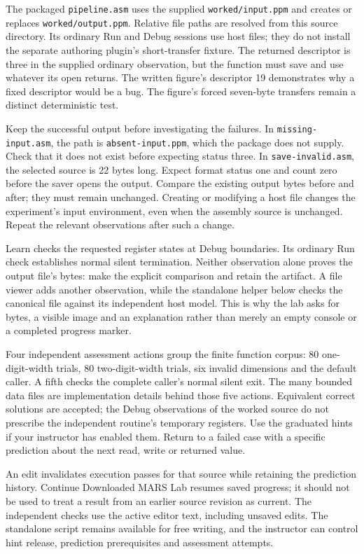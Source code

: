 The packaged \texttt{pipeline.asm} uses the supplied \texttt{worked/\allowbreak input.ppm}
and creates or replaces \texttt{worked/\allowbreak output.ppm}. Relative file paths are
resolved from this source directory. Its ordinary Run and Debug sessions use
host files; they do not install the separate authoring plugin's short-transfer
fixture. The returned descriptor is three in the supplied ordinary observation,
but the function must save and use whatever its open returns. The written
figure's descriptor 19 demonstrates why a fixed descriptor would be a bug.
The figure's forced seven-byte transfers remain a distinct deterministic test.

Keep the successful output before investigating the failures. In
\texttt{missing-input.asm}, the path is \texttt{absent-input.ppm}, which the
package does not supply. Check that it does not exist before expecting status
three. In \texttt{save-invalid.asm}, the selected source is 22 bytes long.
Expect format status one and count zero before the saver opens the output.
Compare the existing output bytes before and after; they must remain unchanged.
Creating or modifying a host file changes the experiment's input environment,
even when the assembly source is unchanged. Repeat the relevant observations
after such a change.

Learn checks the requested register states at Debug boundaries. Its ordinary
Run check establishes normal silent termination. Neither observation alone
proves the output file's bytes: make the explicit comparison and retain the
artifact. A file viewer adds another observation, while the standalone helper
below checks the canonical file against its independent host model. This is
why the lab asks for bytes, a visible image and an explanation rather than
merely an empty console or a completed progress marker.

Four independent assessment actions group the finite function corpus: 80
one-digit-width trials, 80 two-digit-width trials, six invalid dimensions and
the default caller. A fifth checks the complete caller's normal silent exit.
The many bounded data files are implementation details behind those five
actions. Equivalent correct solutions are accepted; the Debug observations of
the worked source do not prescribe the independent routine's temporary registers.
Use the graduated hints if your instructor has enabled them. Return to a failed
case with a specific prediction about the next read, write or returned value.

An edit invalidates execution passes for that source while retaining the
prediction history. Continue Downloaded MARS Lab resumes saved progress; it
should not be used to treat a result from an earlier source revision as current.
The independent checks use the active editor text, including unsaved edits.
The standalone script remains available for free writing, and the instructor
can control hint release, prediction prerequisites and assessment attempts.


